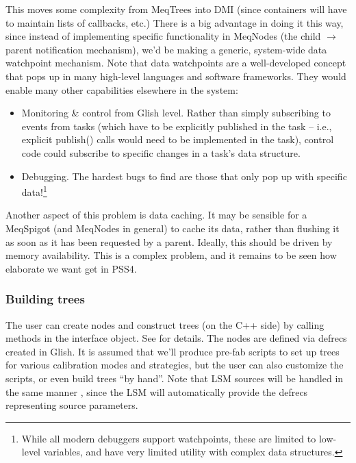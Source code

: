 \documentclass[12pt]{article}
\begin{document}
  This moves some complexity from MeqTrees into DMI (since containers will have
  to maintain lists of callbacks, etc.) There is a big advantage in doing it
  this way, since instead of implementing specific functionality in MeqNodes
  (the child $\rightarrow$ parent notification mechanism), we'd be making a
  generic, system-wide data watchpoint mechanism. Note that data watchpoints
  are a well-developed concept that pops up in many high-level languages and
  software frameworks. They would enable many other capabilities elsewhere in
  the system:

  \begin{itemize}
  
  \item Monitoring \& control from Glish level. Rather than simply subscribing
  to events from tasks (which have to be explicitly published in the task --
  i.e., explicit publish() calls would need to be implemented in the task),
  control code could subscribe to specific changes in a task's data structure.

  \item Debugging. The hardest bugs to find are those that only pop up with
  specific data!\footnote{While all modern debuggers support watchpoints, these
  are limited to low-level variables, and have very limited utility with
  complex data structures.}

  \end{itemize}

  Another aspect of this problem is data caching. It may be sensible for a
  MeqSpigot (and MeqNodes in general) to cache its data, rather than flushing
  it as soon as it has been requested by a parent. Ideally, this should be
  driven by memory availability. This is a complex problem, and it remains to
  be seen how elaborate we want get in PSS4.

\subsubsection{Building trees}

  The user can create nodes and construct trees (on the C++ side) by calling
  methods in the interface object. See \cite{PSS4} for details. The nodes are
  defined via defrecs created in Glish. It is assumed that we'll produce
  pre-fab scripts to set up trees for various calibration modes and strategies,
  but the user can also customize the scripts, or even build trees ``by hand''.
  Note that LSM sources will be handled in the same manner \cite{GSM}, since
  the LSM will automatically provide the defrecs representing source
  parameters. 
\end{document}
